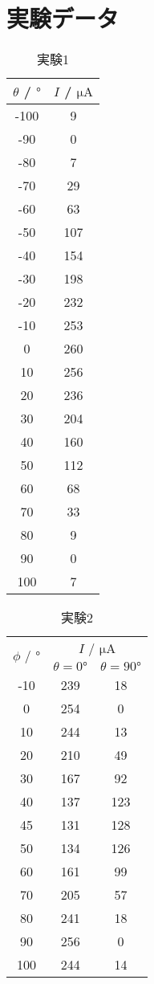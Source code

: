\appendix
\appendix
\renewcommand{\thetable}{\Alph{section}.\arabic{table}}
\setcounter{table}{0}
\section{実験データ}
\begin{table}[h]
   \caption{実験1}
   \label{tab:app_res1}
   \centering
   \begin{tabular}{cc}
     \hline
     $\theta$ / $\si{\degree}$&$I$ / $\si{\micro\ampere}$\\
     \hline \hline
     -100 & 9 \\
-90 & 0 \\
-80 & 7 \\
-70 & 29 \\
-60 & 63 \\
-50 & 107 \\
-40 & 154 \\
-30 & 198 \\
-20 & 232 \\
-10 & 253 \\
0 & 260 \\
10 & 256 \\
20 & 236 \\
30 & 204 \\
40 & 160 \\
50 & 112 \\
60 & 68 \\
70 & 33 \\
80 & 9 \\
90 & 0 \\
100 & 7 \\
     \hline
   \end{tabular}
\end{table}
\begin{table}[h]
   \caption{実験2}
   \label{tab:app_res2}
   \centering
   \begin{tabular}{ccc}
     \hline
     \multirow{2}{*}{$\phi$ / $\si{\degree}$}&\multicolumn{2}{c}{$I$ / $\si{\micro\ampere}$}\\ \cline{2-3}
     &$\theta=0\si{\degree}$&$\theta=90\si{\degree}$\\
     \hline \hline
     -10 & 239 & 18 \\
0 & 254 & 0 \\
10 & 244 & 13 \\
20 & 210 & 49 \\
30 & 167 & 92 \\
40 & 137 & 123 \\
45 & 131 & 128 \\
50 & 134 & 126 \\
60 & 161 & 99 \\
70 & 205 & 57 \\
80 & 241 & 18 \\
90 & 256 & 0 \\
100 & 244 & 14 \\
     \hline
   \end{tabular}
\end{table}
